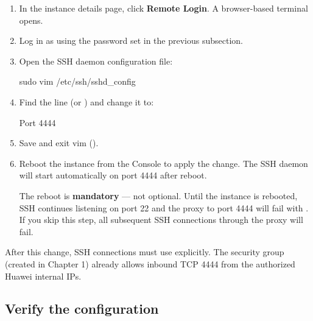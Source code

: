 \documentclass{guide}
\begin{document}
\stepbystep
\begin{enumerate}
  \item In the instance details page, click \textbf{Remote Login}.
        A browser-based terminal opens.

  \item Log in as  using the password set in the previous
        subsection.
  \item Open the SSH daemon configuration file:

  \begin{code}[bash]
sudo vim /etc/ssh/sshd_config
  \end{code}

  \item Find the line  (or ) and change it
        to:

  \begin{code}
Port 4444
  \end{code}

  \item Save and exit vim ().
  \item Reboot the instance from the Console to apply the change.
        The SSH daemon will start automatically on port 4444 after reboot.


  \begin{warning}
  The reboot is \textbf{mandatory} --- not optional. Until the instance is
  rebooted, SSH continues listening on port 22 and the proxy
   to port 4444 will fail with
  . If you skip
  this step, all subsequent SSH connections through the proxy will fail.
  \end{warning}
\end{enumerate}

\begin{infobox}
After this change, SSH connections must use  explicitly.
The security group  (created in Chapter 1) already allows
inbound TCP 4444 from the authorized Huawei internal IPs.
\end{infobox}

\subsection{Verify the configuration}
\end{document}
